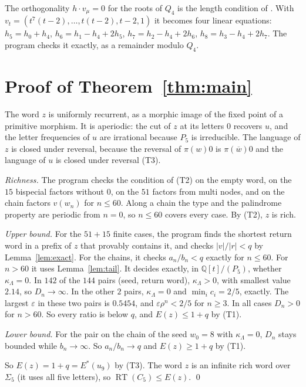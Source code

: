 \documentclass[11pt]{article}
\theoremstyle{remark}
\newcommand{\RT}{\operatorname{RT}}
\begin{document}
The orthogonality $h\cdot v_\mu=0$ for the roots of $Q_4$ is the length condition of
\cite[Proposition~17]{dp-limit}. With
$v_t=(t^7(t-2),\dots,t(t-2),t-2,1)$ it becomes four linear equations:
$h_5=h_0+h_4$, $h_6=h_1-h_4+2h_5$, $h_7=h_2-h_4+2h_6$, $h_8=h_3-h_4+2h_7$. The program
checks it exactly, as a remainder modulo $Q_4$.

\section{Proof of Theorem~\ref{thm:main}}\label{sec:main}

The word $z$ is uniformly recurrent, as a morphic image of the fixed point of a primitive
morphism. It is aperiodic: the cut of $z$ at its letters $0$ recovers $u$, and the letter
frequencies of $u$ are irrational because $P_5$ is irreducible. The language of $z$ is
closed under reversal, because the reversal of $\pi(w)0$ is $\pi(\overline w)0$ and the
language of $u$ is closed under reversal (T3).

\emph{Richness.} The program checks the condition of (T2) on the empty word, on the $15$
bispecial factors without $0$, on the $51$ factors from multi nodes, and on the chain
factors $v(w_n)$ for $n\le60$. Along a chain the type and the palindrome property are
periodic from $n=0$, so $n\le60$ covers every case. By (T2), $z$ is rich.

\emph{Upper bound.} For the $51+15$ finite cases, the program finds the shortest return
word in a prefix of $z$ that provably contains it, and checks $|v|/|r|<q$ by
Lemma~\ref{lem:exact}. For the chains, it checks $a_n/b_n<q$ exactly for $n\le60$. For
$n>60$ it uses Lemma~\ref{lem:tail}. It decides exactly, in $\mathbb Q[t]/(P_5)$, whether
$\kappa_\Lambda=0$. In $142$ of the $144$ pairs (seed, return word), $\kappa_\Lambda>0$,
with smallest value $2.14$, so $D_n\to\infty$. In the other $2$ pairs,
$\kappa_\Lambda=0$ and $\min_ic_i=2/5$, exactly. The largest $\varepsilon$ in these two
pairs is $0.5454$, and $\varepsilon\rho^n<2/5$ for $n\ge3$. In all cases $D_n>0$ for
$n>60$. So every ratio is below $q$, and $E(z)\le1+q$ by (T1).

\emph{Lower bound.} For the pair on the chain of the seed $w_0=8$ with $\kappa_\Lambda=0$,
$D_n$ stays bounded while $b_n\to\infty$. So $a_n/b_n\to q$ and $E(z)\ge1+q$ by (T1).

So $E(z)=1+q=E^*(u_9)$ by (T3). The word $z$ is an infinite rich word over $\Sigma_5$
(it uses all five letters), so $\RT(C_5)\le E(z)$. \qed
\end{document}
